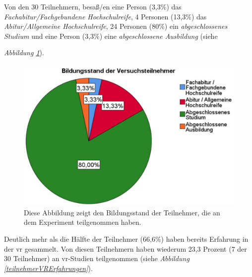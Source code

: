 \documentclass[a4paper,11pt]{article}%
\renewcommand{\\}{\vspace*{0.5\baselineskip} \newline}
\begin{document}
Von den 30 Teilnehmern, besaß/en eine Person (3,3\%) das \textit{Fachabitur/Fachgebundene Hochschulreife}, 4 Personen (13,3\%) das \textit{Abitur/Allgemeine Hochschulreife}, 24 Personen (80\%) ein \textit{abgeschlossenes Studium} und eine Person (3,3\%) eine \textit{abgeschlossene Ausbildung} (siehe {\textit{Abbildung \ref{teilnehmerBildungsstand}}).

\begin{figure}[H]
		\begin{footnotesize}
		\centering
			\includegraphics[scale=0.4]{Abbildungen/Demographie/teilnehmerBildungsstand.JPG}
			\caption[Der Bildungsstand der Teilnehmer]{Diese Abbildung zeigt den Bildungsstand der Teilnehmer, die an dem Experiment teilgenommen haben.}
			\label{teilnehmerBildungsstand}
		\end{footnotesize}
	\end{figure}

Deutlich mehr als die Hälfte der Teilnehmer (66,6\%) haben bereits Erfahrung in der \ac{vr} gesammelt. Von diesen Teilnehmern haben wiederum 23,3 Prozent (7 der 30 Teilnehmer) an \ac{vr}-Studien teilgenommen (siehe \textit{Abbildung \ref{teilnehmerVRErfahrungen}}).

}
\end{document}
